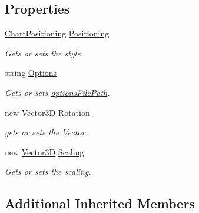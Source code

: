 \subsection*{Properties}
\begin{DoxyCompactItemize}
\item 
\hyperlink{class_a_rdev_kit_1_1_model_1_1_project_1_1_chart_positioning}{Chart\-Positioning} \hyperlink{class_a_rdev_kit_1_1_model_1_1_project_1_1_chart_ab0188f5581ff70bd3c70e5490646f26a}{Positioning}
\begin{DoxyCompactList}\small\item\em Gets or sets the style. \end{DoxyCompactList}\item 
string \hyperlink{class_a_rdev_kit_1_1_model_1_1_project_1_1_chart_ad53af854e1106059d97d0845a6fece6d}{Options}
\begin{DoxyCompactList}\small\item\em Gets or sets \hyperlink{class_a_rdev_kit_1_1_model_1_1_project_1_1_chart_aaf91a6b3628dd8bc5e1717c1fada4f49}{options\-File\-Path}. \end{DoxyCompactList}\item 
new \hyperlink{class_a_rdev_kit_1_1_model_1_1_project_1_1_vector3_d}{Vector3\-D} \hyperlink{class_a_rdev_kit_1_1_model_1_1_project_1_1_chart_ad65da47b510958a72b05f6e796307508}{Rotation}
\begin{DoxyCompactList}\small\item\em gets or sets the Vector \end{DoxyCompactList}\item 
new \hyperlink{class_a_rdev_kit_1_1_model_1_1_project_1_1_vector3_d}{Vector3\-D} \hyperlink{class_a_rdev_kit_1_1_model_1_1_project_1_1_chart_a29acf84a78af7e2d3a671b39dc823252}{Scaling}
\begin{DoxyCompactList}\small\item\em Gets or sets the scaling. \end{DoxyCompactList}\end{DoxyCompactItemize}
\subsection*{Additional Inherited Members}


